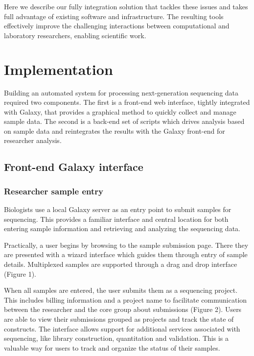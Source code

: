 \documentclass[10pt]{bmc_article}
\newenvironment{bmcformat}{\begin{raggedright}\baselineskip20pt\sloppy\setboolean{publ}{false}}{\end{raggedright}\baselineskip20pt\sloppy}
\begin{document}
\begin{bmcformat}
Here we describe our fully integration solution that tackles these
issues and takes full advantage of existing software and
infrastructure. The resulting tools effectively improve the
challenging interactions between computational and laboratory
researchers, enabling scientific work.

\section*{Implementation}

Building an automated system for processing next-generation sequencing
data required two components. The first is a front-end web interface,
tightly integrated with Galaxy, that provides a graphical method to
quickly collect and manage sample data. The second is a back-end set
of scripts which drives analysis based on sample data and reintegrates
the results with the Galaxy front-end for researcher analysis.

\subsection*{Front-end Galaxy interface}

\subsubsection*{Researcher sample entry}

Biologists use a local Galaxy server as an entry point to submit
samples for sequencing. This provides a familiar interface and central
location for both entering sample information and retrieving and
analyzing the sequencing data.

Practically, a user begins by browsing to the sample submission
page. There they are presented with a wizard interface which guides
them through entry of sample details. Multiplexed samples are
supported through a drag and drop interface (Figure 1).

When all samples are entered, the user submits them as a sequencing
project. This includes billing information and a project name to
facilitate communication between the researcher and the core group
about submissions (Figure 2). Users are able to view their submissions
grouped as projects and track the state of constructs. The interface
allows support for additional services associated with sequencing,
like library construction, quantitation and validation. This is a
valuable way for users to track and organize the status of their
samples.


\end{bmcformat}
\end{document}
